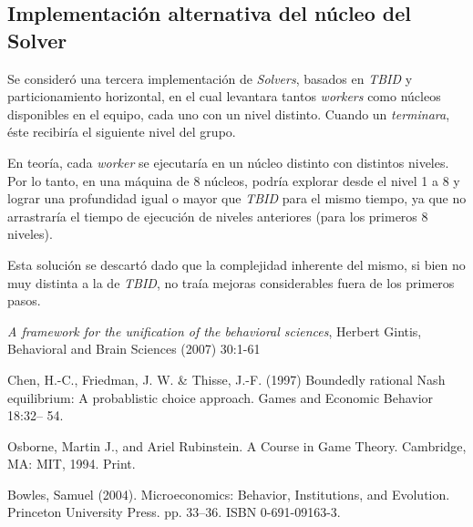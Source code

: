\documentclass[10pt,a4paper,notitlepage]{article}
\begin{document}
\subsection{Implementación alternativa del núcleo del Solver}

Se consideró una tercera implementación de \textit{Solvers}, basados en \textit{TBID} y particionamiento horizontal, en el cual levantara tantos \textit{workers} como núcleos disponibles en el equipo, cada uno con un nivel distinto. Cuando un \textit{terminara}, éste recibiría el siguiente nivel del grupo.

En teoría, cada \textit{worker} se ejecutaría en un núcleo distinto con distintos niveles. Por lo tanto, en una máquina de 8 núcleos, podría explorar desde el nivel 1 a 8 y lograr una profundidad igual o mayor que \textit{TBID} para el mismo tiempo, ya que no arrastraría el tiempo de ejecución de niveles anteriores (para los primeros 8 niveles).

Esta solución se descartó dado que la complejidad inherente del mismo, si bien no muy distinta a la de \textit{TBID}, no traía mejoras considerables fuera de los primeros pasos.

\begin{thebibliography}{9}
   \emph{A framework for the unification of the behavioral sciences}, Herbert Gintis, Behavioral and Brain Sciences (2007) 30:1-61

   Chen, H.-C., Friedman, J. W. \& Thisse, J.-F. (1997) Boundedly rational Nash
equilibrium: A probablistic choice approach. Games and Economic Behavior
18:32– 54.

   Osborne, Martin J., and Ariel Rubinstein. A Course in Game Theory. Cambridge, MA: MIT, 1994. Print.

   Bowles, Samuel (2004). Microeconomics: Behavior, Institutions, and Evolution. Princeton University Press. pp. 33–36. ISBN 0-691-09163-3.
\end{thebibliography}
\end{document}
